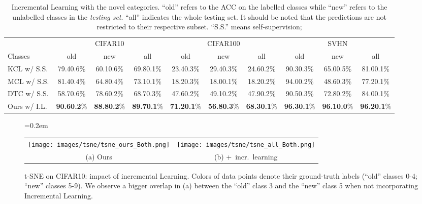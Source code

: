 \begin{table*}[htb]
\footnotesize
\centering
\caption{Incremental Learning with the novel categories. ``old'' refers to the ACC on the labelled classes while ``new'' refers to the unlabelled classes in the \emph{testing set}.
``all'' indicates the whole testing set.
It should be noted that the predictions are not restricted to their respective subset. ``S.S.'' means self-supervision; }\label{tab:increment}
\begin{tabular}{lccccccccc}
\toprule
& \multicolumn{3}{c}{CIFAR10} & \multicolumn{3}{c}{CIFAR100} & \multicolumn{3}{c}{SVHN}\\
\cmidrule(rl){2-4}
\cmidrule(rl){5-7}
\cmidrule(rl){8-10}
Classes       & old      & new     & all        & old       & new       & all       & old       & new       & all \\\midrule
KCL w/ S.S.
  & 79.40.6\%   & 60.10.6\%  & 69.80.1\%     & 23.40.3\%    & 29.40.3\%    & 24.60.2\%    & 90.30.3\%    & 65.00.5\%    & 81.00.1\% \\
MCL w/ S.S.
  & 81.40.4\%   & 64.80.4\%  & 73.10.1\%     & 18.20.3\%    & 18.00.1\%    & 18.20.2\%    & 94.00.2\%    & 48.60.3\%    & 77.20.1\% \\
DTC w/ S.S.
  & 58.70.6\%   & 78.60.2\%  & 68.70.3\%     & 47.60.2\%    & 49.10.2\%    & 47.90.2\%    & 90.50.3\%    & 72.80.2\%    & 84.00.1\% \\
\midrule
Ours w/ I.L.
 & \textbf{90.60.2}\% & \textbf{88.80.2}\%  & \textbf{89.70.1}\% & \textbf{71.20.1}\% & \textbf{56.80.3}\% & \textbf{68.30.1}\% & \textbf{96.30.1}\% & \textbf{96.10.0}\% & \textbf{96.20.1}\% \\
\bottomrule
\end{tabular}
\end{table*}


\begin{figure}[t]
\centering
\tabcolsep=0.2em
\renewcommand{\arraystretch}{0.25}
\begin{tabular}[b]{cc}
{\texttt{[image: images/tsne/tsne\_ours\_Both.png]}} &
{\texttt{[image: images/tsne/tsne\_all\_Both.png]}} \\
(a) Ours & (b) +~incr.~learning
\end{tabular}\hfill
\caption{t-SNE on CIFAR10: impact of incremental Learning.
Colors of data points denote their ground-truth labels (``old'' classes 0-4; ``new'' classes 5-9). We observe a bigger overlap in (a) between the ``old'' class 3 and the ``new'' class 5 when not incorporating Incremental Learning.}\label{fig:tsne_both}
\end{figure}

